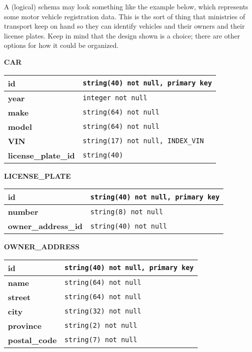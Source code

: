 A (logical) schema may look something like the example below, which represents some motor vehicle registration data. This is the sort of thing that ministries of transport keep on hand so they can identify vehicles and their owners and their license plates. Keep in mind that the design shown is a choice; there are other options for how it could be organized.

\begin{center}
	\textbf{CAR}\\
	\begin{tabular}{|l|l|}\hline
		\textbf{id} & \texttt{string(40) not null, primary key}\\ \hline
		\textbf{year} & \texttt{integer not null}\\ \hline
		\textbf{make} & \texttt{string(64) not null}\\ \hline
		\textbf{model} & \texttt{string(64) not null}\\ \hline		
		\textbf{VIN} & \texttt{string(17) not null, INDEX\_VIN}\\ \hline		
		\textbf{license\_plate\_id} & \texttt{string(40)}\\ \hline		
	\end{tabular}
	
	\textbf{LICENSE\_PLATE}\\
	\begin{tabular}{|l|l|}\hline
		\textbf{id} & \texttt{string(40) not null, primary key}\\ \hline
		\textbf{number} & \texttt{string(8) not null}\\ \hline
		\textbf{owner\_address\_id} & \texttt{string(40) not null}\\ \hline		
	\end{tabular}
	
		\textbf{OWNER\_ADDRESS}\\
	\begin{tabular}{|l|l|}\hline
		\textbf{id} & \texttt{string(40) not null,  primary key}\\ \hline
		\textbf{name} & \texttt{string(64) not null}\\ \hline
		\textbf{street} & \texttt{string(64) not null}\\ \hline
		\textbf{city} & \texttt{string(32) not null}\\ \hline
		\textbf{province} & \texttt{string(2) not null}\\ \hline
		\textbf{postal\_code} & \texttt{string(7) not null}\\ \hline

	\end{tabular}
\end{center}

